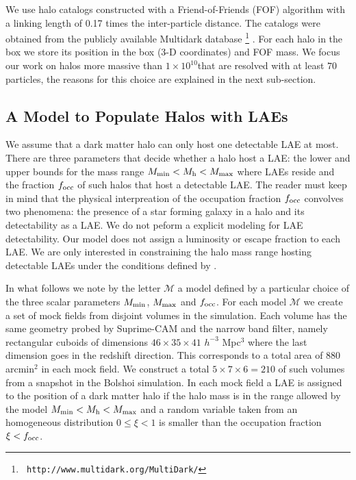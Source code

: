 \documentclass[usenatbib]{mn2e}
\newcommand{\hMsun}{{\ifmmode{h^{-1}{\rm
        {M_{\odot}}}}\else{$h^{-1}{\rm{M_{\odot}}}$}\fi}}
\begin{document}
We use halo catalogs constructed with a Friend-of-Friends (FOF)
algorithm with a linking length of 0.17 times the inter-particle
distance. The catalogs were obtained from the publicly available
Multidark database \footnote{{\tt
    http://www.multidark.org/MultiDark/}}
\citep{2011arXiv1109.0003R}. For each halo in the box we store its
position in the box (3-D coordinates) and FOF mass. We focus our work
on halos more massive than $1\times 10^{10}$\hMsun that are resolved
with at least $70$ particles, the reasons for this choice are
explained in the next sub-section.  


\subsection{A Model to Populate Halos with LAEs}
\label{subsec:mocks}

We assume that a dark matter halo can only host one
detectable LAE at most.  There are three parameters that
decide whether a halo host a LAE: the lower and upper bounds for the
mass range $M_{\rm min}< M_{\rm h} < M_{\rm max}$ where LAEs reside and the fraction $f_{\rm occ}$ of such halos that host a detectable LAE. The reader
must keep in mind that the physical interpreation of the occupation
fraction $f_{\rm occ}$ convolves two phenomena: the presence of a star
forming galaxy in a halo and its detectability as a LAE.  We do not
peform a explicit modeling for LAE detectability. Our model does not
assign a luminosity or escape fraction to each LAE.  We are only
interested in constraining the halo mass range hosting detectable LAEs
under the conditions defined by \cite{Yamada2012}.  


In what follows we note by the letter ${\mathcal M}$ a model
defined by a particular choice of the three scalar parameters $M_{\rm
  min}$, $M_{\rm  max}$ and $f_{\rm occ}$. For each model ${\mathcal
  M}$ we create a set of mock fields from disjoint volumes in the
simulation. Each volume has the same geometry probed by Suprime-CAM
and the narrow band filter, namely rectangular cuboids of dimensions
$46\times 35\times 41$ $h^{-3}$ Mpc$^{3}$ where the last dimension goes
in the redshift direction. This corresponds to a total area of $880$
arcmin$^{2}$ in each mock field. We construct a total $5\times 7
\times 6=210$ of such volumes from a snapshot in the Bolshoi
simulation. In each mock field a LAE is assigned to the position of a
dark matter halo if the halo mass is in the range allowed by the model
$M_{\rm min}<M_{\rm h}<M_{\rm max}$ and a random variable taken from
an homogeneous distribution $0\leq \xi<1$ is smaller than the occupation
fraction $\xi<f_{\rm occ}$.
\end{document}
